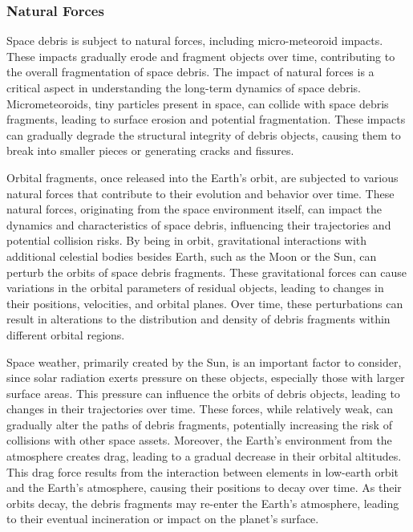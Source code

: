 \documentclass[11pt]{article} %
\begin{document}
\subsubsection{Natural Forces}
Space debris is subject to natural forces, including micro-meteoroid impacts. These impacts gradually erode and fragment objects over time, contributing to the overall fragmentation of space debris. The impact of natural forces is a critical aspect in understanding the long-term dynamics of space debris. Micrometeoroids, tiny particles present in space, can collide with space debris fragments, leading to surface erosion and potential fragmentation. These impacts can gradually degrade the structural integrity of debris objects, causing them to break into smaller pieces or generating cracks and fissures.

Orbital fragments, once released into the Earth's orbit, are subjected to various natural forces that contribute to their evolution and behavior over time. These natural forces, originating from the space environment itself, can impact the dynamics and characteristics of space debris, influencing their trajectories and potential collision risks. By being in orbit, gravitational interactions with additional celestial bodies besides Earth, such as the Moon or the Sun, can perturb the orbits of space debris fragments. These gravitational forces can cause variations in the orbital parameters of residual objects, leading to changes in their positions, velocities, and orbital planes. Over time, these perturbations can result in alterations to the distribution and density of debris fragments within different orbital regions.

Space weather, primarily created by the Sun, is an important factor to consider, since solar radiation exerts pressure on these objects, especially those with larger surface areas. This pressure can influence the orbits of debris objects, leading to changes in their trajectories over time. These forces, while relatively weak, can gradually alter the paths of debris fragments, potentially increasing the risk of collisions with other space assets. Moreover, the Earth's environment from the atmosphere creates drag, leading to a gradual decrease in their orbital altitudes. This drag force results from the interaction between elements in low-earth orbit and the Earth's atmosphere, causing their positions to decay over time. As their orbits decay, the debris fragments may re-enter the Earth's atmosphere, leading to their eventual incineration or impact on the planet's surface.
\end{document}
